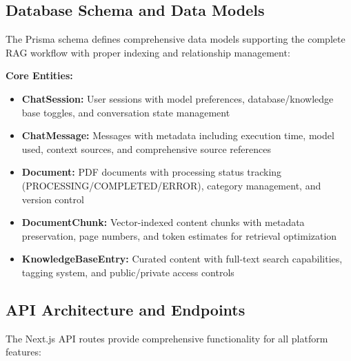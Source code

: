 \subsection{Database Schema and Data Models}
\label{subsec:database_schema_s2}

The Prisma schema defines comprehensive data models supporting the complete RAG workflow with proper indexing and relationship management:

\textbf{Core Entities:}
\begin{itemize}
    \item \textbf{ChatSession:} User sessions with model preferences, database/knowledge base toggles, and conversation state management
    \item \textbf{ChatMessage:} Messages with metadata including execution time, model used, context sources, and comprehensive source references
    \item \textbf{Document:} PDF documents with processing status tracking (PROCESSING/COMPLETED/ERROR), category management, and version control
    \item \textbf{DocumentChunk:} Vector-indexed content chunks with metadata preservation, page numbers, and token estimates for retrieval optimization
    \item \textbf{KnowledgeBaseEntry:} Curated content with full-text search capabilities, tagging system, and public/private access controls
\end{itemize}

\subsection{API Architecture and Endpoints}
\label{subsec:api_architecture_s2}

The Next.js API routes provide comprehensive functionality for all platform features:

